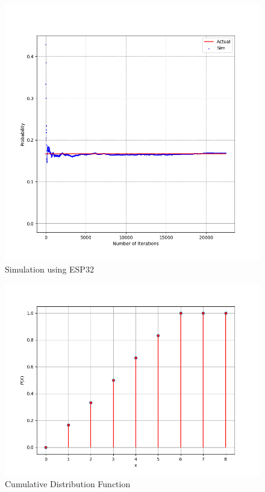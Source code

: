 \documentclass[journal]{IEEEtran}
\begin{document}
	\begin{figure}[h!]
	\centering
	\includegraphics[width=\columnwidth]{figs/sim.png}
	\caption{Simulation using ESP32}
\end{figure}
	
		\begin{figure}[h!]
		\centering
		\includegraphics[width=\columnwidth]{figs/cdf.png}
		\caption{Cumulative Distribution Function}
	\end{figure}
\end{document}
